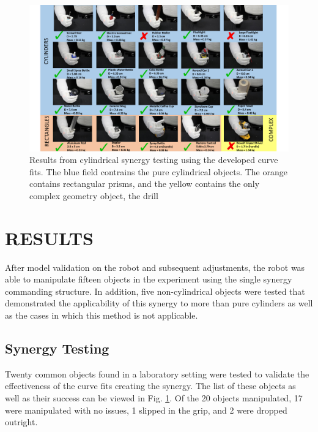 \documentclass[runningheads,a4paper]{llncs}
\begin{document}
\begin{figure}[!b]
  \centering
  \includegraphics[width=1.08\linewidth]{Objects3.pdf}
  \caption{Results from cylindrical synergy testing using the developed curve fits.  The blue field contrains the pure cylindrical objects.  The orange contains rectangular prisms, and the yellow contains the only complex geometry object, the drill}
  \label{objects} 
\end{figure}

\section{RESULTS}
\label{results}


After model validation on the robot and subsequent adjustments, the robot was able to manipulate fifteen objects in the experiment using the single synergy commanding structure. In addition, five non-cylindrical objects were tested that demonstrated the applicability of this synergy to more than pure cylinders as well as the cases in which this method is not applicable.  


\subsection{Synergy Testing}

Twenty common objects found in a laboratory setting were tested to validate the effectiveness of the curve fits creating the synergy. The list of these objects as well as their success can be viewed in Fig. \ref{objects}.  Of the 20 objects manipulated, 17 were manipulated with no issues, 1 slipped in the grip, and 2 were dropped outright. 
\end{document}
